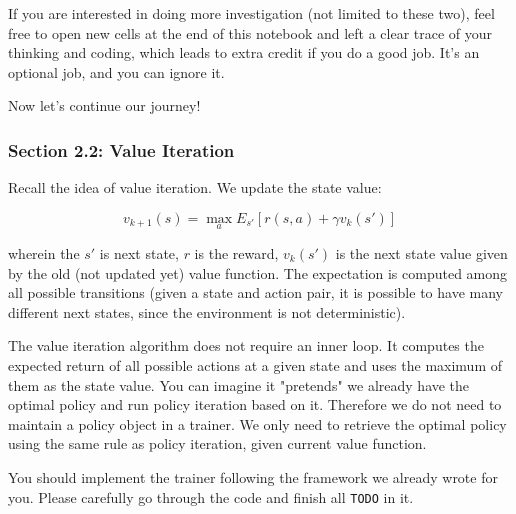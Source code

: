 \documentclass[11pt]{article}
\begin{document}
If you are interested in doing more investigation (not limited to these
two), feel free to open new cells at the end of this notebook and left a
clear trace of your thinking and coding, which leads to extra credit if
you do a good job. It's an optional job, and you can ignore it.

Now let's continue our journey!

    \subsubsection{Section 2.2: Value
Iteration}\label{section-2.2-value-iteration}

Recall the idea of value iteration. We update the state value:

\[v_{k+1}(s) = \max_a E_{s'} [r(s, a) + \gamma v_{k}(s')]\]

wherein the \(s'\) is next state, \(r\) is the reward, \(v_{k}(s')\) is
the next state value given by the old (not updated yet) value function.
The expectation is computed among all possible transitions (given a
state and action pair, it is possible to have many different next
states, since the environment is not deterministic).

The value iteration algorithm does not require an inner loop. It
computes the expected return of all possible actions at a given state
and uses the maximum of them as the state value. You can imagine it
"pretends" we already have the optimal policy and run policy iteration
based on it. Therefore we do not need to maintain a policy object in a
trainer. We only need to retrieve the optimal policy using the same rule
as policy iteration, given current value function.

You should implement the trainer following the framework we already
wrote for you. Please carefully go through the code and finish all
\texttt{TODO} in it.
\end{document}
